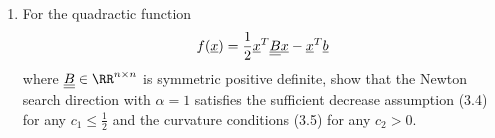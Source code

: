 \documentclass[11pt, oneside]{article}
\begin{document}
\begin{enumerate}
\begin{proof}
\begin{align*}
\begin{bmatrix}
          & & & \M{Q}_n
        \end{bmatrix}
        \begin{bmatrix}
          \M{\Lambda}_1 & & & \\
          & \M{\Lambda}_2 & & \\
          & & \ddots & \\
          & & & \M{\Lambda}_n
        \end{bmatrix}
        \begin{bmatrix}
          \M{Q}_1^{-1} & & & \\
          & \M{Q}_2^{-1} & & \\
          & & \ddots & \\
          & & & \M{Q}_n^{-1}
        \end{bmatrix} \\
        &=
        \begin{bmatrix}
          \M{Q}_1 \M{\Lambda}_1 \M{Q}_1^{-1}& & & \\
          & \M{Q}_2 \M{\Lambda}_2 \M{Q}_2^{-1}& & \\
          & & \ddots & \\
          & & & \M{Q}_n\M{\Lambda}_n\M{Q}_n^{-1}
        \end{bmatrix} \\
        &=
        \begin{bmatrix}
          \M{B}_1 & & & \\
          & \M{B}_2 & & \\
          & & \ddots & \\
          & & & \M{B}_n
        \end{bmatrix} \\
        &= \M{B}
      \end{align*}
      This shows that the eigenvalues of $\M{B}$ are the union of the eigenvalues
      of the matrices $\M{B}_k$.
      Also the eigenvectors of $\M{B}$ are related to the eigenvectors of
      $\M{B}$.
      The eigenvectors of $\M{B}$ are the columns of $\M{Q}$, so they are the
      eigenvectors of $\M{B}_k$ but embedded in zeroes in the proper way.
    \end{proof}

  \item %
    For the quadractic function
    \[
      f(\underline{x}) = \frac{1}{2} \underline{x}^T \underline{\underline{B}} \underline{x} - \underline{x}^T \underline{b}
    \]
    where $\M{B} \in \RR^{n \times n}$ is symmetric positive definite, show that the
    Newton search direction with $\alpha = 1$ satisfies the sufficient
    decrease assumption (3.4) for any $c_1 \le \frac{1}{2}$ and the curvature
    conditions (3.5) for any $c_2 > 0$.


\end{enumerate}
\end{document}
